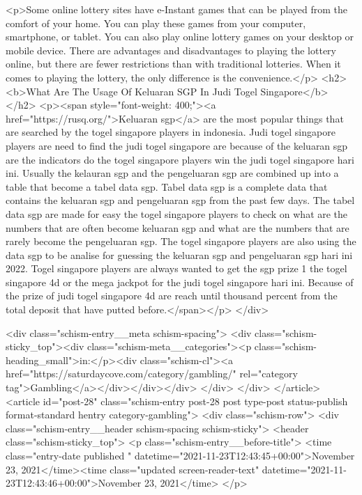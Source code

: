 {<p>Some online lottery sites have e-Instant games that can be played from the comfort of your home. You can play these games from your computer, smartphone, or tablet. You can also play online lottery games on your desktop or mobile device. There are advantages and disadvantages to playing the lottery online, but there are fewer restrictions than with traditional lotteries. When it comes to playing the lottery, the only difference is the convenience.</p>
<h2><b>What Are The Usage Of Keluaran SGP In Judi Togel Singapore</b></h2>
<p><span style="font-weight: 400;"><a href="https://rusq.org/">Keluaran sgp</a> are the most popular things that are searched by the togel singapore players in indonesia. Judi togel singapore players are need to find the judi togel singapore are because of the keluaran sgp are the indicators do the togel singapore players win the judi togel singapore hari ini. Usually the kelauran sgp and the pengeluaran sgp are combined up into a table that become a tabel data sgp. Tabel data sgp is a complete data that contains the keluaran sgp and pengeluaran sgp from the past few days. The tabel data sgp are made for easy the togel singapore players to check on what are the numbers that are often become keluaran sgp and what are the numbers that are rarely become the pengeluaran sgp. The togel singapore players are also using the data sgp to be analise for guessing the keluaran sgp and pengeluaran sgp hari ini 2022. Togel singapore players are always wanted to get the sgp prize 1 the togel singapore 4d or the mega jackpot for the judi togel singapore hari ini. Because of the prize of judi togel singapore 4d are reach until thousand percent from the total deposit that have putted before.</span></p>
		</div>

		<div class="schism-entry__meta schism-spacing">			<div class="schism-sticky_top"><div class="schism-meta__categories"><p class="schism-heading_small">in:</p><div class="schism-cl"><a href="https://saturdaycove.com/category/gambling/" rel="category tag">Gambling</a></div></div></div>		</div>
	</div>
</article>
<article id="post-28" class="schism-entry post-28 post type-post status-publish format-standard hentry category-gambling">
	<div class="schism-row">		<div class="schism-entry__header schism-spacing schism-sticky">			<header class="schism-sticky_top">				<p class="schism-entry__before-title">
					<time class="entry-date published " datetime="2021-11-23T12:43:45+00:00">November 23, 2021</time><time class="updated screen-reader-text" datetime="2021-11-23T12:43:46+00:00">November 23, 2021</time>				</p>

}
